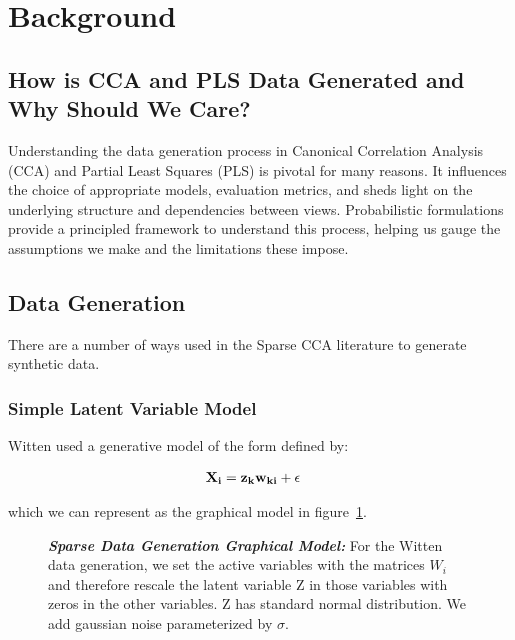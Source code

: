 \section{Background}\label{sec:background}

\subsection{How is CCA and PLS Data Generated and Why Should We Care?}\label{sec:how-is-cca-and-pls-data-generated-and
-why-should-we-care?}

Understanding the data generation process in Canonical Correlation Analysis (CCA) and Partial Least Squares (PLS) is pivotal for many reasons. It influences the choice of appropriate models, evaluation metrics, and sheds light on the underlying structure and dependencies between views. Probabilistic formulations provide a principled framework to understand this process, helping us gauge the assumptions we make and the limitations these impose.


\subsection{Data Generation}\label{subsec:data-generation-background}

There are a number of ways used in the Sparse CCA literature to generate synthetic data.

\subsubsection{Simple Latent Variable Model}

Witten\cite{witten2009extensions} used a generative model of the form defined by:

\begin{align}\label{eq:wittengen}
    & \bold{X_i}=\bold{z_kw_{ki}}+\epsilon
\end{align}

which we can represent as the graphical model in figure~\ref{fig:wittengraphical}.

\begin{figure}
\centering
 \caption[Sparse Data Generation Graphical Model]{\textit{\textbf{Sparse Data Generation Graphical Model: }}For the Witten data generation, we set the active variables with the matrices $W_i$ and therefore rescale the latent variable Z in those variables with zeros in the other variables. Z has standard normal distribution. We add gaussian noise parameterized by $\sigma$.}
 \label{fig:wittengraphical}
\end{figure}


